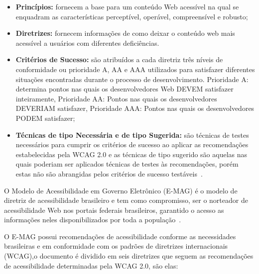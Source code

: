 \begin{itemize}
  \item \textbf{Princ\'ipios:} fornecem a base para um conte\'udo Web
  acess\'ivel na qual se enquadram as caracter\'isticas percept\'ivel, oper\'avel,
  compreens\'ivel e robusto;
  \item \textbf{Diretrizes:} fornecem informa\c{c}\~oes de como deixar o
  conte\'udo web mais acess\'ivel a usu\'arios com diferentes defici\^encias.
  \item \textbf{Crit\'erios de Sucesso:} s\~ao atribu\'idos a cada diretriz
  tr\^es n\'iveis de conformidade ou prioridade A, AA e AAA utilizados para
  satisfazer diferentes situa\c{c}\~oes encontradas durante o processo de
  desenvolvimento. Prioridade A: determina pontos nas quais os desenvolvedores
  Web DEVEM satisfazer inteiramente, Prioridade AA: Pontos nas quais os
  desenvolvedores DEVERIAM satisfazer, Prioridade AAA: Pontos nas quais os
  desenvolvedores PODEM satisfazer;
  \item \textbf{T\'ecnicas de tipo Necess\'aria e de tipo Sugerida:} s\~ao
  t\'ecnicas de testes necess\'arios para cumprir os crit\'erios de sucesso ao
  aplicar as recomenda\c{c}\~oes estabelecidas pela WCAG 2.0 e as t\'ecnicas de tipo
  sugerido s\~ao aquelas nas quais poderiam ser aplicados t\'ecnicas de testes
  \`as recomenda\c{c}\~oes, por\'em estas n\~ao s\~ao abrangidas pelos crit\'erios
  de sucesso test\'aveis~\cite{Caldwell}.
\end{itemize} 

O Modelo de Acessibilidade em Governo Eletr\^onico (E-MAG) \'e o modelo de
diretriz de acessibilidade brasileiro e  tem como compromisso, ser o norteador de
acessibilidade Web nos portais federais brasileiros, garantido o acesso as
informa\c{c}\~oes neles disponibilizados por toda a popula\c{c}\~ao~\cite{eMAG}.  
     
O E-MAG possui recomenda\c{c}\~oes de acessibilidade conforme as necessidades
brasileiras e em conformidade com os padr\~oes de diretrizes internacionais
(WCAG),o documento \'e dividido em seis diretrizes que seguem as
recomenda\c{c}\~oes de acessibilidade determinadas pela WCAG 2.0, s\~ao elas:

